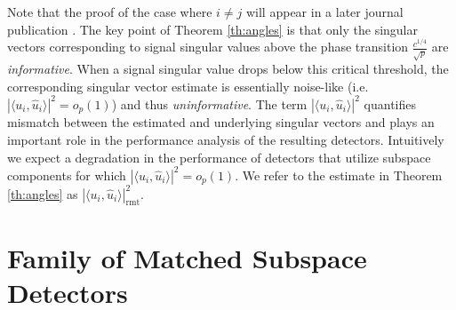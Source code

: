 Note that the proof of the case where $i\neq j$ will appear in a later journal publication \cite{asendorf}. The key point of Theorem \ref{th:angles} is that only the singular vectors corresponding to signal singular values above the phase transition $\frac{c^{1/4}}{\sqrt{p}}$ are \textit{informative}. When a signal singular value drops below this critical threshold, the corresponding singular vector estimate is essentially noise-like  (i.e. $|\langle u_i,\widehat{u}_i\rangle|^2=o_{p}(1)$) and thus \textit{uninformative}. The term $|\langle u_i,\widehat{u}_i\rangle|^2$ quantifies mismatch between the estimated and underlying singular vectors and plays an important role in the performance analysis of the resulting detectors. Intuitively we expect a degradation in the performance of detectors  that utilize subspace components for which $|\langle u_i,\widehat{u}_i\rangle|^2=o_{p}(1)$.  We refer to the estimate in Theorem \ref{th:angles} as $|\langle u_i,\widehat{u}_i\rangle|^2_{\text{rmt}}$.

\section{Family of Matched Subspace Detectors}\label{sec:derive}

